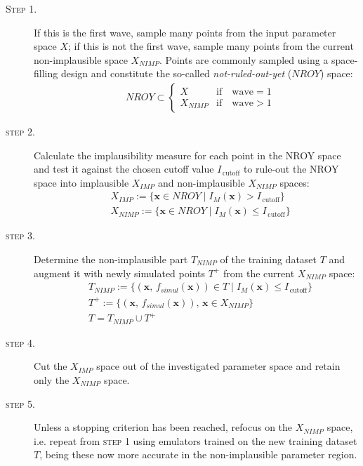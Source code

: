 \begin{description}
    \item[\textsc{Step 1.}] If this is the first wave, sample many points from the input parameter space $X$; if this is not the first wave, sample many points from the current non-implausible space $X_{NIMP}$. Points are commonly sampled using a space-filling design and constitute the so-called \textit{not-ruled-out-yet} ($NROY$) space:
    \begin{align*}
        & NROY\subset\begin{cases}
        X &\text{if}\quad \text{wave}=1 \\
        X_{NIMP} &\text{if}\quad \text{wave}>1
        \end{cases}
    \end{align*} 
    \item[\textsc{step 2.}] Calculate the implausibility measure for each point in the NROY space and test it against the chosen cutoff value $I_{\,\text{cutoff}}$ to rule-out the NROY space into implausible $X_{IMP}$ and non-implausible $X_{NIMP}$ spaces:
    \begin{align*}
        & X_{IMP} := \{\mathbf{x}\in NROY\;\vert\;I_{M}(\mathbf{x}) > I_{\,\text{cutoff}}\} \\
        & X_{NIMP} := \{\mathbf{x}\in NROY\;\vert\;I_{M}(\mathbf{x}) \le I_{\,\text{cutoff}}\}
    \end{align*}
    \item[\textsc{step 3.}] Determine the non-implausible part $T_{NIMP}$ of the training dataset $T$ and augment it with newly simulated points $T^{+}$ from the current $X_{NIMP}$ space:
    \begin{align*}
        & T_{NIMP} := \{(\mathbf{x},\,f_{simul}(\mathbf{x}))\in T\;\vert\;I_{M}(\mathbf{x}) \le I_{\,\text{cutoff}}\} \\
        & T^{+} := \{(\mathbf{x},\,f_{simul}(\mathbf{x})),\,\mathbf{x}\in X_{NIMP}\} \\
        & T = T_{NIMP}\cup T^{+}
    \end{align*}
    \item[\textsc{step 4.}] Cut the $X_{IMP}$ space out of the investigated parameter space and retain only the $X_{NIMP}$ space.
    \item[\textsc{step 5.}] Unless a stopping criterion has been reached, refocus on the $X_{NIMP}$ space, i.e. repeat from \textsc{step 1} using emulators trained on the new training dataset $T$, being these now more accurate in the non-implausible parameter region.
\end{description}

